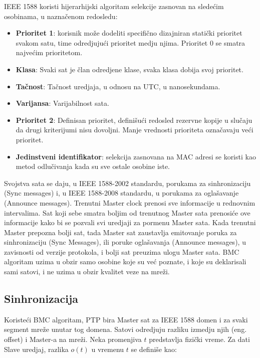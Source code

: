 \documentclass[a4paper,12pt, master]{etf}
\begin{document}
	IEEE 1588 koristi hijerarhijski algoritam selekcije zasnovan na
	slede\'{c}im osobinama, u nazna\v{c}enom redosledu:

	\begin{itemize}
        \item \textbf{Prioritet 1}: korisnik mo\v{z}e dodeliti specifi\v{c}no
		dizajniran stati\v{c}ki prioritet svakom satu, time odredjuju\'{c}i
		prioritet medju njima. Prioritet 0 se smatra najve\'{c}im prioritetom.
        \item \textbf{Klasa}: Svaki sat je \v{c}lan odredjene klase, svaka klasa
        dobija svoj prioritet.
        \item \textbf{Ta\v{c}nost}: Ta\v{c}nost uredjaja, u odnosu na UTC, u
		nanosekundama.
        \item \textbf{Varijansa}: Varijabilnost sata.
        \item \textbf{Prioritet 2}: Definisan prioritet, defini\v{s}u\'{c}i
        redosled rezervne kopije u slu\v{c}aju da drugi kriterijumi nisu
        dovoljni. Manje vrednosti prioriteta ozna\v{c}avaju ve\'{c}i prioritet.
        \item \textbf{Jedinstveni identifikator}: selekcija zasnovana na MAC
        adresi se koristi kao metod odlu\v{c}ivanja kada su sve ostale osobine
        iste.
	\end{itemize}

	Svojstva sata se daju, u IEEE 1588-2002 standardu, porukama za sinhronizaciju
	(Sync messages) i, u IEEE 1588-2008 standardu, u porukama za ogla\v{s}avanje
	(Announce messages). Trenutni Master clock prenosi sve informacije u
	rednovnim intervalima. Sat koji sebe smatra boljim od trenutnog Master
	sata prenosi\'{c}e ove informacije kako bi se pozvali svi uredjaji za
	pormenu Master sata. Kada trenutni Master prepozna bolji sat, tada Master
	sat	zaustavlja emitovanje poruka za sinhronizaciju (Sync Messages), ili
	poruke ogla\v{s}avanja (Announce messages), u zavisnosti od verzije
	protokola, i bolji sat preuzima ulogu Master sata. BMC algoritam uzima u
	obzir samo osobine koje su ve\'{c} poznate, i koje su deklarisali sami
	satovi, i ne uzima u obzir kvalitet veze na mre\v{z}i.

	\subsection{Sinhronizacija}

	Koriste\'{c}i BMC algoritam, PTP bira Master sat za IEEE 1588 domen i za
	svaki segment mre\v{z}e unutar tog domena. Satovi odredjuju razliku izmedju
	njih (eng\@. offset) i Master-a na mre\v{z}i. Neka promenjiva $t$ predstavlja
	fizi\v{c}ki vreme. Za dati Slave uredjaj, razlika $o(t)$ u vremenu $t$ se
	defini\v{s}e kao:
\end{document}
